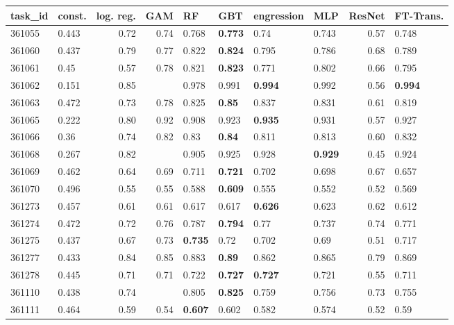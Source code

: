 \begin{table}[ht!]
\centering
\begingroup\footnotesize
\begin{tabular}{llrrllllrl}
  \hline
\hline
task\_id & const. & log. reg. & GAM & RF & GBT & engression & MLP & ResNet & FT-Trans. \\ 
  \hline
361055 & 0.443 & 0.72 & 0.74 & 0.768 & \textbf{0.773} & 0.74 & 0.743 & 0.57 & 0.748 \\ 
  361060 & 0.437 & 0.79 & 0.77 & 0.822 & \textbf{0.824} & 0.795 & 0.786 & 0.68 & 0.789 \\ 
  361061 & 0.45 & 0.57 & 0.78 & 0.821 & \textbf{0.823} & 0.771 & 0.802 & 0.66 & 0.795 \\ 
  361062 & 0.151 & 0.85 &  & 0.978 & 0.991 & \textbf{0.994} & 0.992 & 0.56 & \textbf{0.994} \\ 
  361063 & 0.472 & 0.73 & 0.78 & 0.825 & \textbf{0.85} & 0.837 & 0.831 & 0.61 & 0.819 \\ 
  361065 & 0.222 & 0.80 & 0.92 & 0.908 & 0.923 & \textbf{0.935} & 0.931 & 0.57 & 0.927 \\ 
  361066 & 0.36 & 0.74 & 0.82 & 0.83 & \textbf{0.84} & 0.811 & 0.813 & 0.60 & 0.832 \\ 
  361068 & 0.267 & 0.82 &  & 0.905 & 0.925 & 0.928 & \textbf{0.929} & 0.45 & 0.924 \\ 
  361069 & 0.462 & 0.64 & 0.69 & 0.711 & \textbf{0.721} & 0.702 & 0.698 & 0.67 & 0.657 \\ 
  361070 & 0.496 & 0.55 & 0.55 & 0.588 & \textbf{0.609} & 0.555 & 0.552 & 0.52 & 0.569 \\ 
  361273 & 0.457 & 0.61 & 0.61 & 0.617 & 0.617 & \textbf{0.626} & 0.623 & 0.62 & 0.612 \\ 
  361274 & 0.472 & 0.72 & 0.76 & 0.787 & \textbf{0.794} & 0.77 & 0.737 & 0.74 & 0.771 \\ 
  361275 & 0.437 & 0.67 & 0.73 & \textbf{0.735} & 0.72 & 0.702 & 0.69 & 0.51 & 0.717 \\ 
  361277 & 0.433 & 0.84 & 0.85 & 0.883 & \textbf{0.89} & 0.862 & 0.865 & 0.79 & 0.869 \\ 
  361278 & 0.445 & 0.71 & 0.71 & 0.722 & \textbf{0.727} & \textbf{0.727} & 0.721 & 0.55 & 0.711 \\ 
  361110 & 0.438 & 0.74 &  & 0.805 & \textbf{0.825} & 0.759 & 0.756 & 0.73 & 0.755 \\ 
  361111 & 0.464 & 0.59 & 0.54 & \textbf{0.607} & 0.602 & 0.582 & 0.574 & 0.52 & 0.59 \\ 

\end{tabular}
\end{table}
